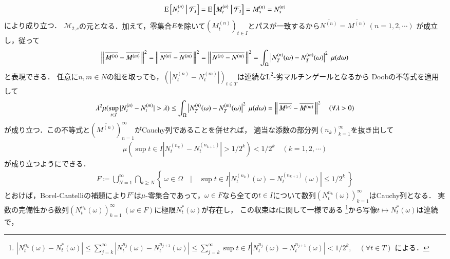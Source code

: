 \begin{description}
{				\begin{align}
					\operatorname{E} \left[ N^{(n)}_t \ \middle|\ \mathcal{F}_s \right] = \operatorname{E} \left[ M^{(n)}_t \ \middle|\ \mathcal{F}_s \right] = M^{(n)}_s = N^{(n)}_s
				\end{align}
				により成り立つ．
			}
			$\mathcal{M}_{2,c}$の元となる．加えて，零集合$E$を除いて$(M^{(n)}_t)_{t \in I}$とパスが一致するから$\overline{N^{(n)}} = \overline{M^{(n)}}\ (n=1,2,\cdots)$
			が成立し，従って
			\begin{align}
				\left\|\, \overline{M^{(n)}} - \overline{M^{(m)}}\, \right\|_{}^2 = \left\|\, \overline{N^{(n)}} - \overline{N^{(m)}}\, \right\|_{}^2 
				=  \left\|\, \overline{N^{(n)} - N^{(m)}}\, \right\|_{}^2
				= \int_{\Omega} \left| N^{(n)}_T(\omega) - N^{(m)}_T(\omega) \right|^2\ \mu(d\omega)
			\end{align}
			と表現できる．
			任意に$n,m \in N$の組を取っても，$(|N^{(n)}_t - N^{(m)}_t|)_{t \in T}$は連続な$\mathrm{L}^2$-劣マルチンゲールとなるから
			Doobの不等式を適用して
			\begin{align}
				\lambda^2 \mu(\operatorname*{sup}_{t \in I} |N^{(n)}_t - N^{(m)}_t| > \lambda) \leq \int_{\Omega} \left| N^{(n)}_T(\omega) - N^{(m)}_T(\omega) \right|^2\ \mu(d\omega)
				= \left\|\, \overline{M^{(n)}} - \overline{M^{(m)}}\, \right\|_{}^2 \quad (\forall \lambda > 0)
			\end{align}
			が成り立つ．この不等式と$(\overline{M^{(n)}})_{n=1}^{\infty}$がCauchy列であることを併せれば，
			適当な添数の部分列$(n_k)_{k=1}^{\infty}$を抜き出して
			\begin{align}
				\mu(\sup{t \in I}{|N^{(n_k)}_t - N^{(n_{k+1})}_t| > 1/2^k}) < 1/2^k \quad (k=1,2,\cdots)
			\end{align}
			が成り立つようにできる．
			\begin{align}
				F \coloneqq \bigcup_{N=1}^{\infty} \bigcap_{k \geq N} \left\{\ \omega \in \Omega \quad|\quad \sup{t \in I}{|N^{(n_k)}_t(\omega) - N^{(n_{k+1})}_t(\omega)|} \leq 1/2^k\ \right\}
			\end{align}
			とおけば，Borel-Cantelliの補題により$F^c$は$\mu$-零集合であって，$\omega \in F$なら全ての$t \in I$について数列$(N^{n_k}_t(\omega))_{k=1}^{\infty}$はCauchy列となる．
			実数の完備性から数列$(N^{n_k}_t(\omega))_{k=1}^{\infty}\ (\omega \in F)$に極限$N^*_t(\omega)$が存在し，
			この収束は$t$に関して一様である
			\footnote{
				$\left| N^{n_k}_t(\omega) - N^*_t(\omega) \right| \leq \sum_{j=k}^{\infty} \left| N^{n_j}_t(\omega) - N^{n_{j+1}}_t(\omega) \right|
				\leq \sum_{j=k}^{\infty} \sup{t \in I}{\left| N^{n_j}_t(\omega) - N^{n_{j+1}}_t(\omega) \right|} < 1/2^k, \quad (\forall t \in T)$
				による．
			}から写像$t \longmapsto N^*_t(\omega)$は連続で，

\end{description}
